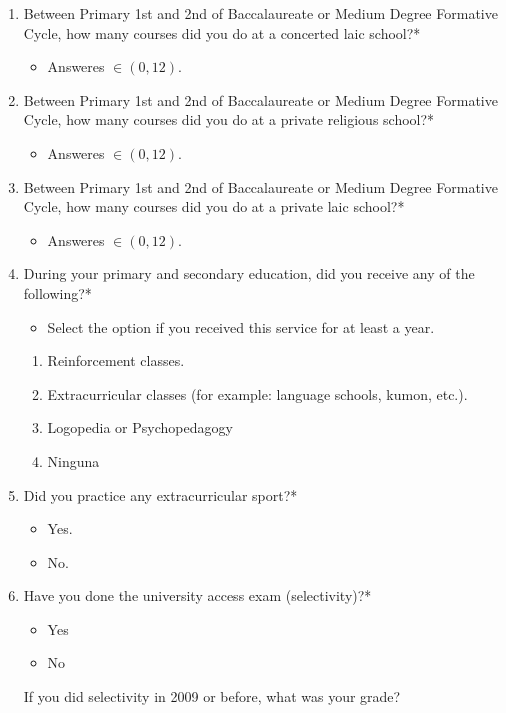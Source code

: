\documentclass[12pt]{article}
\begin{document}
\begin{enumerate}
\begin{enumerate}
\begin{itemize}
\end{itemize}
\item Between Primary 1st and 2nd of Baccalaureate or Medium Degree Formative Cycle, how many courses did you do at a concerted laic school?*
\begin{itemize}
\item Answeres $\in (0, 12)$.
\end{itemize}
\item Between Primary 1st and 2nd of Baccalaureate or Medium Degree Formative Cycle, how many courses did you do at a private religious school?*
\begin{itemize}
\item Answeres $\in (0, 12)$.
\end{itemize}
\item Between Primary 1st and 2nd of Baccalaureate or Medium Degree Formative Cycle, how many courses did you do at a private laic school?*
\begin{itemize}
\item Answeres $\in (0, 12)$.
\end{itemize}
\item During your primary and secondary education, did you receive any of the following?*
\begin{itemize}
\item Select the option if you received this service for at least a year.
\end{itemize}
\begin{enumerate}
\item Reinforcement classes.
\item Extracurricular classes (for example: language schools, kumon, etc.).
\item Logopedia or Psychopedagogy
\item Ninguna
\end{enumerate}
\item Did you practice any extracurricular sport?*
\begin{itemize}
\item Yes.
\item No.
\end{itemize}
\item Have you done the university access exam (selectivity)?*
\begin{itemize}
\item Yes
\item No
\end{itemize}
If you did selectivity in 2009 or before, what was your grade?
\begin{itemize}

\end{itemize}
\end{enumerate}
\end{enumerate}
\end{document}
